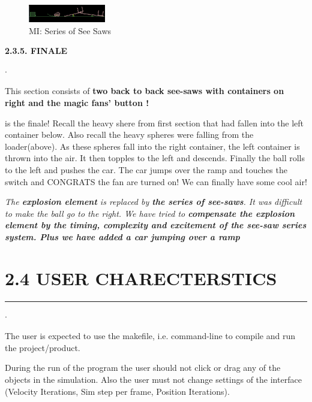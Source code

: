\documentclass{report}
\begin{document}
\begin{figure}
\begin{center}
\includegraphics[width=0.3\textwidth, height=0.2\textwidth]{latex/box2d_5.png}
\end{center}
\caption{MI: Series of See Saws}
\end{figure}
\textbf{2.3.5. FINALE}
\begin{list}{$\cdot$}{\setlength{\leftmargin}{0em}}
\item This section consists of \textbf{two back to back see-saws \cite{revolute_joint} with containers on right and the magic fans' button \cite{contact_listener}!}
\item is the finale! Recall the heavy shere from first section that had fallen into the left container below. Also recall the heavy spheres were falling from the loader(above). As these spheres fall into the right container, the left container is thrown into the air. It then topples to the left and descends. Finally the ball rolls to the left and pushes the car. The car jumps over the ramp and touches the switch \cite{contact_listener} and CONGRATS the fan are turned on! We can finally have some cool air!
\item \emph{The \textbf{explosion element} is replaced by \textbf{the series of see-saws}. It was difficult to make the ball go to the right. We have tried to \textbf{compensate the explosion element by the timing, complexity and excitement of the see-saw series system. Plus we have added a car jumping over a ramp}}  
\end{list}

\section*{2.4 USER CHARECTERSTICS}
\hrule \large
\begin{list}{$\cdot$}{\setlength{\leftmargin}{0em}}
\item The user is expected to use the makefile, i.e. command-line to compile and run the project/product.
\item During the run of the program the user should not click or drag any of the objects in the simulation. Also the user must not change settings of the interface (Velocity Iterations, Sim step per frame, Position Iterations).
\end{list}
\end{document}
